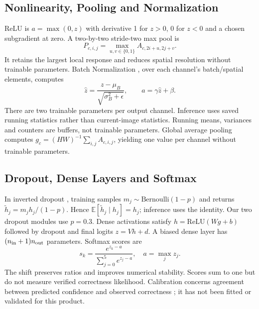 \documentclass[conference]{IEEEtran}
\begin{document}
\subsection{Nonlinearity, Pooling and Normalization}
ReLU is $a=\max(0,z)$ with derivative 1 for $z>0$, 0 for $z<0$ and a chosen subgradient at zero. A two-by-two stride-two max pool is
\begin{equation}
P_{c,i,j}=\max_{u,v\in\{0,1\}} A_{c,2i+u,2j+v}.
\end{equation}
It retains the largest local response and reduces spatial resolution without trainable parameters. Batch Normalization \cite{bn}, over each channel's batch/spatial elements, computes
\begin{equation}
\hat z=\frac{z-\mu_B}{\sqrt{\sigma_B^2+\epsilon}},\qquad a=\gamma\hat z+\beta.
\end{equation}
There are two trainable parameters per output channel. Inference uses saved running statistics rather than current-image statistics. Running means, variances and counters are buffers, not trainable parameters. Global average pooling computes $g_c=(HW)^{-1}\sum_{i,j}A_{c,i,j}$, yielding one value per channel without trainable parameters.

\subsection{Dropout, Dense Layers and Softmax}
In inverted dropout \cite{dropout}, training samples $m_j\sim\mathrm{Bernoulli}(1-p)$ and returns $\tilde h_j=m_jh_j/(1-p)$. Hence $\mathbb E[\tilde h_j\mid h_j]=h_j$; inference uses the identity. Our two dropout modules use $p=0.3$. Dense activations satisfy $h=\mathrm{ReLU}(Wg+b)$ followed by dropout and final logits $z=Vh+d$. A biased dense layer has $(n_{\rm in}+1)n_{\rm out}$ parameters. Softmax scores are
\begin{equation}
s_k=\frac{e^{z_k-a}}{\sum_{j=0}^5e^{z_j-a}},\quad a=\max_j z_j.
\end{equation}
The shift preserves ratios and improves numerical stability. Scores sum to one but do not measure verified correctness likelihood. Calibration concerns agreement between predicted confidence and observed correctness \cite{calibration}; it has not been fitted or validated for this product.
\end{document}
